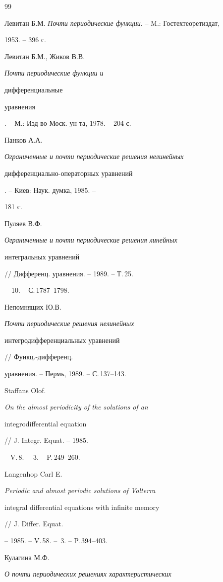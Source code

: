 \begin{thebibliography}{99} 


 




Левитан Б.М. {\em Почти периодические функции}. -- M.: Гостехтеоретиздат, 


1953. -- 396 с.  




Левитан Б.М., Жиков В.В. {\em Почти периодические функции и 


дифференциальные  


уравнения}. -- М.: Изд-во Моск. ун-та, 1978. -- 204 с.  




Панков А.А. {\em Ограниченные и почти периодические решения нелинейных 


дифференциально-операторных уравнений}. -- Киев: Наук. думка, 1985. --  


181 с. 




Пуляев В.Ф. {\em Ограниченные и почти периодические решения линейных  


интегральных уравнений} // Дифференц. уравнения. -- 1989. -- Т.\,25. 


-- \No\,10. -- С.\,1787--1798. 




Непомнящих Ю.В. {\em Почти периодические решения нелинейных  


интегродифференциальных уравнений} // Функц.-дифференц. 


уравнения. -- Пермь, 1989. -- С.\,137--143. 




Staffans Olof. {\em On the almost periodicity of the solutions of an 


integrodifferential equation} // J. Integr. Equat. -- 1985. 


-- V.\,8. -- \No\,3. -- P.\,249--260. 




Langenhop Carl E. {\em Periodic and almost periodic solutions of Volterra 


integral differential equations with infinite memory} // J. Differ. Equat. 


-- 1985. -- V.\,58. -- \No\,3. -- P.\,394--403. 




Кулагина М.Ф. {\em О почти периодических решениях характеристических  


}
\end{thebibliography}
